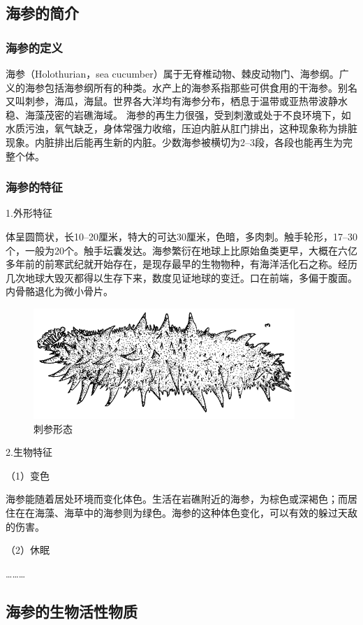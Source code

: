 \documentclass{QITthesis}
\begin{document}
\subsection{海参的简介}
\subsubsection{海参的定义}

海参（Holothurian，sea cucumber）属于无脊椎动物、棘皮动物门、海参纲。广义的海参包括海参纲所有的种类。水产上的海参系指那些可供食用的干海参。别名又叫刺参，海瓜，海鼠。世界各大洋均有海参分布，栖息于温带或亚热带波静水稳、海藻茂密的岩礁海域。
海参的再生力很强，受到刺激或处于不良环境下，如水质污浊，氧气缺乏，身体常强力收缩，压迫内脏从肛门排出，这种现象称为排脏现象。内脏排出后能再生新的内脏。少数海参被横切为2--3段，各段也能再生为完整个体。

\subsubsection{海参的特征}

1.外形特征

体呈圆筒状，长10--20厘米，特大的可达30厘米，色暗，多肉刺。触手轮形，17--30个，一般为20个。触手坛囊发达。海参繁衍在地球上比原始鱼类更早，大概在六亿多年前的前寒武纪就开始存在，是现存最早的生物物种，有海洋活化石之称。经历几次地球大毁灭都得以生存下来，数度见证地球的变迁。口在前端，多偏于腹面。内骨骼退化为微小骨片。

\begin{figure}[H]
    \centering
    \includegraphics[width=.5\textwidth]{example_figures/图片1.png}
    \caption{刺参形态}
\end{figure}

2.生物特征

（1）变色

海参能随着居处环境而变化体色。生活在岩礁附近的海参，为棕色或深褐色；而居住在在海藻、海草中的海参则为绿色。海参的这种体色变化，可以有效的躲过天敌的伤害。

（2）休眠

\dots\dots\dots

\subsection{海参的生物活性物质}
\end{document}
